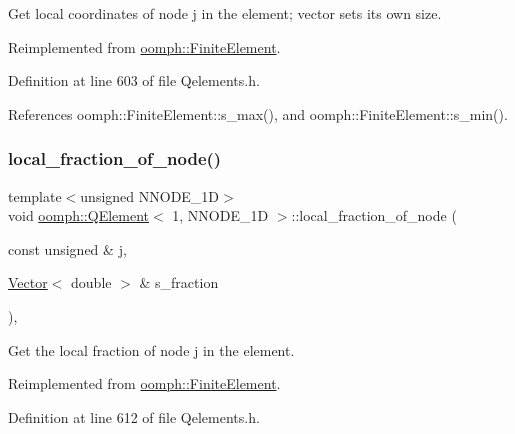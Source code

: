 Get local coordinates of node j in the element; vector sets its own size. 



Reimplemented from \hyperlink{classoomph_1_1FiniteElement_a22bc4ee35e4f948d8d7fba18c7b4f4c4}{oomph\+::\+Finite\+Element}.



Definition at line 603 of file Qelements.\+h.



References oomph\+::\+Finite\+Element\+::s\+\_\+max(), and oomph\+::\+Finite\+Element\+::s\+\_\+min().

\mbox{\label{classoomph_1_1QElement_3_011_00_01NNODE__1D_01_4_a3b67e66f9987f60b4e497af099e163c0}} 
\subsubsection{\texorpdfstring{local\+\_\+fraction\+\_\+of\+\_\+node()}{local\_fraction\_of\_node()}}
{\footnotesize\ttfamily template$<$unsigned N\+N\+O\+D\+E\+\_\+1D$>$ \\
void \hyperlink{classoomph_1_1QElement}{oomph\+::\+Q\+Element}$<$ 1, N\+N\+O\+D\+E\+\_\+1D $>$\+::local\+\_\+fraction\+\_\+of\+\_\+node (\begin{DoxyParamCaption}\item[{const unsigned \&}]{j,  }\item[{\hyperlink{classoomph_1_1Vector}{Vector}$<$ double $>$ \&}]{s\+\_\+fraction }\end{DoxyParamCaption})\hspace{0.3cm}{\ttfamily [inline]}, {\ttfamily [virtual]}}



Get the local fraction of node j in the element. 



Reimplemented from \hyperlink{classoomph_1_1FiniteElement_a41640b9a9e5f6461cd8ebb8218502b07}{oomph\+::\+Finite\+Element}.



Definition at line 612 of file Qelements.\+h.

